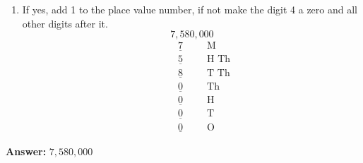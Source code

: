 \documentclass{article}
\begin{document}
\begin{enumerate}[label=\textbf{Step \arabic*:}]
    \item If yes, add 1 to the place value number, if not make the digit 4 a zero and all other digits after it.
    \[7,580,000\]
    \begin{align*}
    &\phantom{H}\underline{\phantom{H}7\phantom{H}} &&\text{M} \\
    &\phantom{H}\underline{\phantom{H}5\phantom{H}} &&\text{H Th} \\
    &\phantom{H}\underline{\phantom{H}8\phantom{H}} &&\text{T Th} \\
    &\phantom{H}\underline{\phantom{H}0\phantom{H}} &&\text{Th} \\
    &\phantom{H}\underline{\phantom{H}0\phantom{H}} &&\text{H} \\
    &\phantom{H}\underline{\phantom{H}0\phantom{H}} &&\text{T} \\
    &\phantom{H}\underline{\phantom{H}0\phantom{H}} &&\text{O}
    \end{align*}
\end{enumerate}

\textbf{Answer:} \(7,580,000\)
\end{document}
